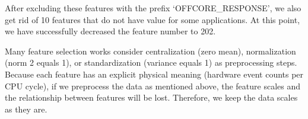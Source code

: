 After excluding these features with the prefix `OFFCORE\_RESPONSE', we also get rid of 10 features that do not have value for some applications. At this point, we have successfully decreased the feature number to 202. 

Many feature selection works consider centralization (zero mean), normalization (norm 2 equals 1), or standardization (variance equals 1) as preprocessing steps. Because each feature has an explicit physical meaning (hardware event counts per CPU cycle), if we preprocess the data as mentioned above, the feature scales and the relationship between features will be lost. Therefore, we keep the data scales as they are.

